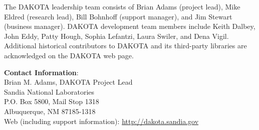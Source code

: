 The DAKOTA leadership team consists of Brian Adams (project lead),
Mike Eldred (research lead), Bill Bohnhoff (support manager), and Jim
Stewart (business manager).  DAKOTA development team members include
Keith Dalbey, John Eddy, Patty Hough, Sophia Lefantzi, Laura Swiler,
and Dena Vigil.  Additional historical contributors to DAKOTA and its
third-party libraries are acknowledged on the DAKOTA web page.

\textbf{Contact Information}:\\
{\small Brian M. Adams, DAKOTA Project Lead}\\
{\small Sandia National Laboratories}\\
{\small P.O. Box 5800, Mail Stop 1318}\\
{\small Albuquerque, NM 87185-1318}\\
{\small Web (including support information): \url{http://dakota.sandia.gov}}
